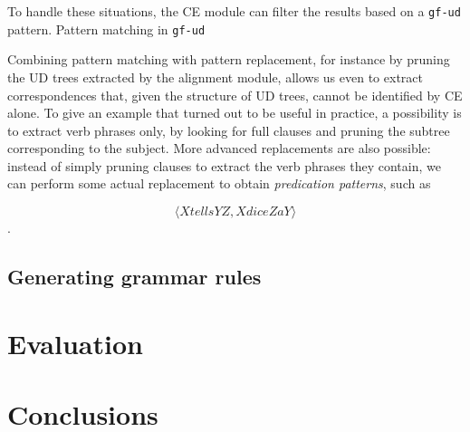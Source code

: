 \documentclass[11pt]{article}
\begin{document}
To handle these situations, the CE module can filter the results based on a \texttt{gf-ud} pattern.
Pattern matching in \texttt{gf-ud} %

Combining pattern matching with pattern replacement, for instance by pruning the UD trees extracted by the alignment module, allows us even to extract correspondences that, given the structure of UD trees, cannot be identified by CE alone. 
To give an example that turned out to be useful in practice, a possibility is to extract verb phrases only, by looking for full clauses and pruning the subtree corresponding to the subject. 
More advanced replacements are also possible: instead of simply pruning clauses to extract the verb phrases they contain, we can perform some actual replacement to obtain \textit{predication patterns}, such as

$$\langle X tells Y Z, X dice Z a Y\rangle$$.


\subsection{Generating grammar rules}

\section{Evaluation} \label{evaluation}

\section{Conclusions} \label{conclusions}

%
%
\end{document}
